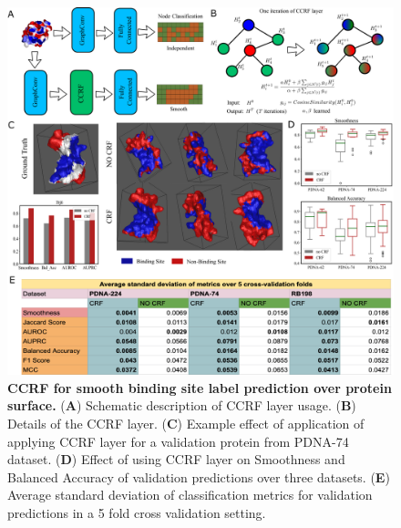 \begin{center}
\begin{figure}[!htp]
                \includegraphics[width=\textwidth]{crffigs/demo_crf_fig.png}
        \caption[CCRF for smooth binding site label prediction over protein surface.]{\textbf{CCRF
        for smooth binding site label prediction over protein surface.} ({\bf A}) Schematic
        description of CCRF layer usage. ({\bf B}) Details of the CCRF layer. ({\bf C}) Example
        effect of application of applying CCRF layer for a validation protein from PDNA-74 dataset.
        ({\bf D}) Effect of using CCRF layer on Smoothness and Balanced Accuracy of validation
        predictions over three datasets. ({\bf E}) Average standard deviation of classification
        metrics for validation predictions in a 5 fold cross validation setting.}
        \label{fig:ccrf} \end{figure} \end{center}

